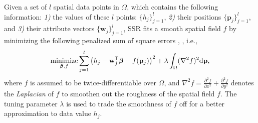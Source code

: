 Given a set of $l$ spatial data points in $\Omega$, which contains the following information: \emph{1)} the values of these $l$ points: $\{h_j\}_{j=1}^l$, \emph{2)} their positions $\{\mathbf p_j\}_{j=1}^l$, and \emph{3)} their attribute vectors $\{\mathbf w_j\}_{j=1}^l$, SSR fits a smooth spatial field $f$ by minimizing the following penalized sum of square errors \cite{Sanga13}, \cite{Ramsay02}, i.e.,
\begin{equation}\label{eq:minSSR}
	\underset{\boldsymbol{\beta}, f}{\text{minimize}}\sum_{j=1}^{l}\big(h_j- {\mathbf w}_j^{\mathsf T} \boldsymbol{\beta} - f(\mathbf p_j) \big)^2 + \lambda\int_\Omega(\nabla^2 f)^2\mathrm{d}\mathbf p,
\end{equation}
where $f$ is assumed to be twice-differentiable over $\Omega$, and
$\nabla^2 f= \frac{\partial^2 f}{\partial x^2}+\frac{\partial^2 f}{\partial y^2}$ denotes the \emph{Laplacian} of $f$ to smoothen out the roughness of the spatial field $f$. The tuning parameter $\lambda$ is used to trade the smoothness of $f$ off for a better approximation to data value $h_j$.








